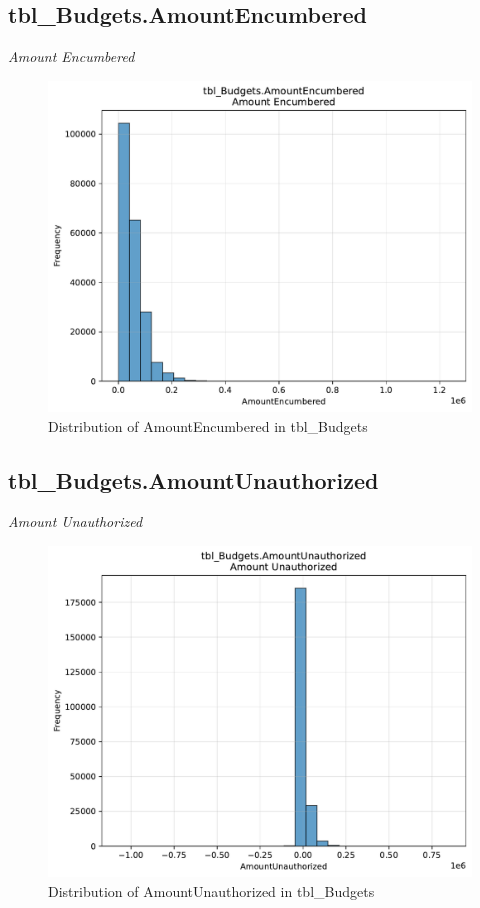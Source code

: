 \subsection{tbl\_Budgets.AmountEncumbered}
\textit{Amount Encumbered}

\begin{figure}[htbp]
\centering
\includegraphics[width=\textwidth]{figures/dbo_tbl_Budgets_AmountEncumbered.pdf}
\caption{Distribution of AmountEncumbered in tbl\_Budgets}
\end{figure}\newpage

\subsection{tbl\_Budgets.AmountUnauthorized}
\textit{Amount Unauthorized}

\begin{figure}[htbp]
\centering
\includegraphics[width=\textwidth]{figures/dbo_tbl_Budgets_AmountUnauthorized.pdf}
\caption{Distribution of AmountUnauthorized in tbl\_Budgets}
\end{figure}\newpage

